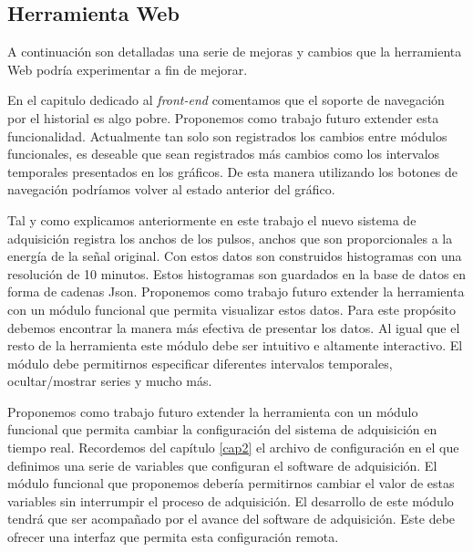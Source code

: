 	\subsection{Herramienta Web}
		A continuación son detalladas una serie de mejoras y cambios que la herramienta Web podría experimentar a fin de mejorar.
		\begin{description}[style=unboxed,leftmargin=0cm,labelwidth=1cm]
			\item[Extender el soporte de navegación por el historial]
				En el capitulo dedicado al \emph{front-end} comentamos que el soporte de navegación por el historial es algo pobre.
				Proponemos como trabajo futuro extender esta funcionalidad. Actualmente tan solo son registrados los cambios entre
				módulos funcionales, es deseable que sean registrados más cambios como los intervalos temporales presentados en los
				gráficos. De esta manera utilizando los botones de navegación podríamos volver al estado anterior del gráfico.
			\item[Anchos de pulso] 
				Tal y como explicamos anteriormente en este trabajo el nuevo sistema de adquisición registra los anchos de los pulsos,
				anchos que son proporcionales a la energía de la señal original. Con estos datos son construidos histogramas con una
				resolución de 10 minutos. Estos histogramas son guardados en la base de datos en forma de cadenas Json. Proponemos
				como trabajo futuro extender la herramienta con un módulo funcional que permita visualizar estos datos. Para este
				propósito debemos encontrar la manera más efectiva de presentar los datos.  Al igual que el resto de la herramienta
				este módulo debe ser intuitivo e altamente interactivo. El módulo debe permitirnos especificar diferentes intervalos
				temporales, ocultar/mostrar series y mucho más.
			\item[Configuración del sistema de adquisición]
				Proponemos como trabajo futuro extender la herramienta con un módulo funcional que permita cambiar la configuración
				del sistema de adquisición en tiempo real. Recordemos del capítulo \ref{cap2} el archivo de configuración en el que
				definimos una serie de variables que configuran el software de adquisición. El módulo funcional que proponemos debería
				permitirnos cambiar el valor de estas variables sin interrumpir el proceso de adquisición. El desarrollo de este
				módulo tendrá que ser acompañado por el avance del software de adquisición. Este debe ofrecer una interfaz que permita
				esta configuración remota.
			\item[Alarmas y Notificación]

\end{description}
